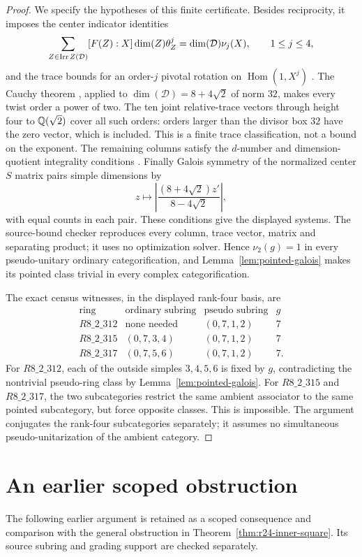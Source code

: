 \begin{proof}
We specify the hypotheses of this finite certificate. Besides
reciprocity, it imposes the center indicator identities
\[
\sum_{Z\in\operatorname{Irr} Z(\mathcal D)}[F(Z):X]\dim(Z)\theta_Z^j
=\dim(\mathcal D)\nu_j(X),\qquad 1\leq j\leq4,
\]
and the trace bounds for an order-$j$ pivotal rotation on
$\operatorname{Hom}(1,X^j)$ \cite{NgIndicators}.
The Cauchy theorem \cite{BNRWCauchy}, applied to
$\dim(\mathcal D)=8+4\sqrt2$ of norm $32$, makes every twist order a
power of two. The ten joint relative-trace vectors through height four
to $\mathbb Q(\sqrt2)$ cover all such orders: orders larger than the divisor
box $32$ have the zero vector, which is included. This is a finite
trace classification, not a bound on the exponent. The remaining
columns satisfy the $d$-number and dimension-quotient integrality
conditions \cite{OstrikCode,EGNO}. Finally Galois symmetry of the
normalized center $S$ matrix \cite{NgCongruence} pairs simple dimensions
by
\[
z\longmapsto
\left|\frac{(8+4\sqrt2)z'}{8-4\sqrt2}\right|,
\]
with equal counts in each pair. These conditions give the displayed
systems. The source-bound checker reproduces every column, trace
vector, matrix and separating product; it uses no optimization solver.
Hence $\nu_2(g)=1$ in every pseudo-unitary ordinary categorification,
and Lemma~\ref{lem:pointed-galois} makes its pointed class trivial in
every complex categorification.

The exact census witnesses, in the displayed rank-four basis, are
\[
\begin{array}{c|cc|c}
\text{ring}&\text{ordinary subring}&\text{pseudo subring}&g\\\hline
R8\_2\_312&\text{none needed}&(0,7,1,2)&7\\
R8\_2\_315&(0,7,3,4)&(0,7,1,2)&7\\
R8\_2\_317&(0,7,5,6)&(0,7,1,2)&7.
\end{array}
\]
For $R8\_2\_312$, each of the outside simples $3,4,5,6$ is fixed by
$g$, contradicting the nontrivial pseudo-ring class by
Lemma~\ref{lem:pointed-galois}. For $R8\_2\_315$ and $R8\_2\_317$,
the two subcategories restrict the same ambient associator to the
same pointed subcategory, but force opposite classes. This is
impossible. The argument conjugates the rank-four subcategories
separately; it assumes no simultaneous pseudo-unitarization of the
ambient category.
\end{proof}

\section{An earlier scoped obstruction}
\label{sec:scoped}
The following earlier argument is retained as a scoped consequence and
comparison with the general obstruction in Theorem~\ref{thm:r24-inner-square}.
Its source subring and grading support are checked separately.

